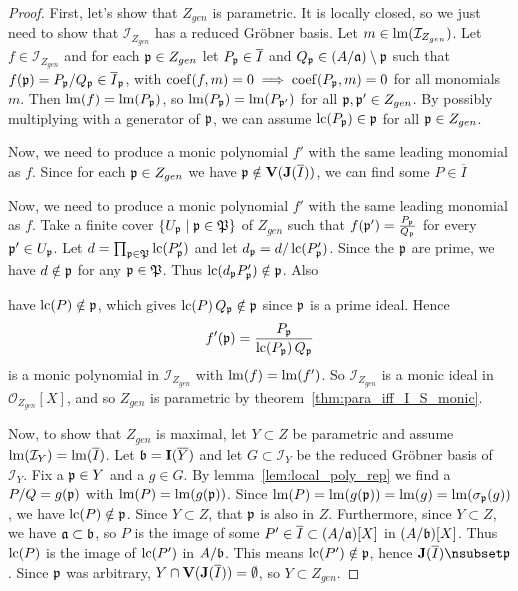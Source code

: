 \begin{proof}
  First, let's show that $Z_{gen}$ is parametric. It is locally closed, so we just need to show that $\mathcal I_{Z_{gen}}$ has a reduced Gröbner basis. Let $m \in \operatorname{lm}(\mathcal I_{Z_{gen}})$. Let $f \in \mathcal I_{Z_{gen}}$ and for each $\mathfrak p \in Z_{gen}$ let $P_{\mathfrak p} \in \overline I$ and $Q_{\mathfrak p} \in (A/\mathfrak{a}) \setminus \mathfrak p$ such that $f(\mathfrak p) = P_{\mathfrak p}/Q_{\mathfrak p} \in \overline I_{\mathfrak p}$, with $\operatorname{coef}(f, m) = 0 \implies \operatorname{coef}(P_{\mathfrak p}, m) = 0$ for all monomials $m$. Then $\operatorname{lm}(f) = \operatorname{lm}(P_{\mathfrak p})$, so $\operatorname{lm}(P_{\mathfrak p}) = \operatorname{lm}(P_{\mathfrak p'})$ for all $\mathfrak p, \mathfrak p' \in Z_{gen}$. By possibly multiplying with a generator of $\mathfrak p$, we can assume $\operatorname{lc}(P_{\mathfrak p}) \in \mathfrak p$ for all $\mathfrak p \in Z_{gen}$.

  Now, we need to produce a monic polynomial $f'$ with the same leading monomial as $f$. Since for each $\mathfrak p \in Z_{gen}$ we have $\mathfrak p \notin \operatorname{\mathbf V}(\operatorname{\mathbf J}(\overline I))$, we can find some $P \in \overline I$

  Now, we need to produce a monic polynomial $f'$ with the same leading monomial as $f$. Take a finite cover $\{U_{\mathfrak p} \mid \mathfrak p \in \mathfrak{P}\}$ of $Z_{gen}$ such that $f(\mathfrak p') = \frac{P_{\mathfrak p}}{Q_{\mathfrak p}}$ for every $\mathfrak p' \in U_{\mathfrak p}$. Let $d = \prod_{\mathfrak p \in \mathfrak{P}} \operatorname{lc}(P'_{\mathfrak p})$ and let $d_{\mathfrak p} = d/\operatorname{lc}(P'_{\mathfrak p})$. Since the $\mathfrak p$ are prime, we have $d \notin \mathfrak p$ for any $\mathfrak p \in \mathfrak{P}$. Thus $\operatorname{lc}(d_{\mathfrak p} P'_{\mathfrak p}) \notin \mathfrak p$. Also




  have $\operatorname{lc}(P) \notin \mathfrak p$, which gives $\operatorname{lc}(P)\,Q_{\mathfrak p} \notin \mathfrak p$ since $\mathfrak p$ is a prime ideal. Hence
  \[f'(\mathfrak p) = \frac{P_{\mathfrak p}}{\operatorname{lc}(P_{\mathfrak p})\, Q_{\mathfrak p}}\]
  is a monic polynomial in $\mathcal I_{Z_{gen}}$ with $\operatorname{lm}(f) = \operatorname{lm}(f')$. So $\mathcal I_{Z_{gen}}$ is a monic ideal in $\mathcal O_{Z_{gen}}[X]$, and so $Z_{gen}$ is parametric by theorem~\ref{thm:para_iff_I_S_monic}.

  Now, to show that $Z_{gen}$ is maximal, let $Y \subset Z$ be parametric and assume $\operatorname{lm}(\mathcal I_{Y}) = \operatorname{lm}(\overline I)$. Let $\mathfrak{b} = \operatorname{\mathbf I}(\overline Y)$ and let $G \subset \mathcal I_{Y}$ be the reduced Gröbner basis of $\mathcal I_{Y}$. Fix a $\mathfrak p \in Y$ and a $g \in G$. By lemma~\ref{lem:local_poly_rep} we find a $P/Q = g(\mathfrak p)$ with $\operatorname{lm}(P) = \operatorname{lm}(g(\mathfrak p))$. Since $\operatorname{lm}(P) = \operatorname{lm}(g(\mathfrak p)) = \operatorname{lm}(g) = \operatorname{lm}(\sigma_{\mathfrak p}(g))$, we have $\operatorname{lc}(P) \notin \mathfrak p$. Since $Y \subset Z$, that $\mathfrak p$ is also in $Z$. Furthermore, since $Y \subset Z$, we have $\mathfrak{a} \subset \mathfrak{b}$, so $P$ is the image of some $P' \in \overline I \subset (A/\mathfrak{a})[X]$ in $(A/\mathfrak{b})[X]$. Thus $\operatorname{lc}(P)$ is the image of $\operatorname{lc}(P')$ in $A/\mathfrak{b}$. This means $\operatorname{lc}(P') \notin \mathfrak p$, hence $\J(\overline I) \nsubset \p$. Since $\mathfrak p$ was arbitrary, $Y \cap \operatorname{\mathbf V}(\operatorname{\mathbf J}(\overline I)) = \emptyset$, so $Y \subset Z_{gen}$.
\end{proof}


